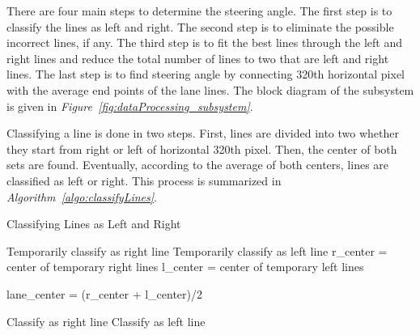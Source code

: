 \documentclass[a4paper,12pt]{article}
\begin{document}
\begin{enumerate}
		
	There are four main steps to determine the steering angle.  The first step is to classify the lines as left and right. The second step is to eliminate the possible incorrect lines, if any. The third step is to fit the best lines through the left and right lines and reduce the total number of lines to two that are left and right lines. The last step is to find steering angle by connecting 320th horizontal pixel with the average end points of the lane lines. The block diagram of the subsystem is given in \textit{Figure~\ref{fig:dataProcessing_subsystem}}.
			
			
Classifying a line is done in two steps. First, lines are divided into two whether they start from right or left of horizontal 320th pixel. Then, the center of both sets are found. Eventually, according to the average of both centers, lines are classified as left or right. This process is summarized in \textit{Algorithm~\ref{algo:classifyLines}}.

\begin{algorithm}[H]
	\caption{Classifying Lines as Left and Right}
	\label{algo:classifyLines}
	\DontPrintSemicolon
	
	{ 
		{
			Temporarily classify as right line 
		}
		\Else
		{
			Temporarily classify as left line 
		}
	}
	r\_center = center of temporary right lines \;
	l\_center = center of temporary left lines \;
	
	lane\_center = (r\_center + l\_center)/2 \;

{ 
	{
		Classify as right line 
	}
	\Else
	{
		Classify as left line 
	}
}
\end{algorithm}
	

\end{enumerate}
\end{document}
